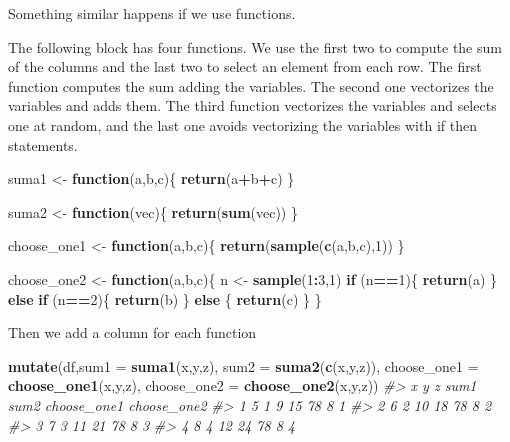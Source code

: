 \documentclass[
]{book}
\newenvironment{Shaded}{\begin{snugshade}}{\end{snugshade}}
\newcommand{\AttributeTok}[1]{\textcolor[rgb]{0.13,0.29,0.53}{#1}}
\newcommand{\CommentTok}[1]{\textcolor[rgb]{0.56,0.35,0.01}{\textit{#1}}}
\newcommand{\ControlFlowTok}[1]{\textcolor[rgb]{0.13,0.29,0.53}{\textbf{#1}}}
\newcommand{\DecValTok}[1]{\textcolor[rgb]{0.00,0.00,0.81}{#1}}
\newcommand{\FunctionTok}[1]{\textcolor[rgb]{0.13,0.29,0.53}{\textbf{#1}}}
\newcommand{\NormalTok}[1]{#1}
\newcommand{\OtherTok}[1]{\textcolor[rgb]{0.56,0.35,0.01}{#1}}
\newcommand{\SpecialCharTok}[1]{\textcolor[rgb]{0.81,0.36,0.00}{\textbf{#1}}}
\theoremstyle{definition}
\theoremstyle{definition}
\theoremstyle{definition}
\theoremstyle{definition}
\theoremstyle{remark}
\begin{document}
Something similar happens if we use functions.

The following block has four functions. We use the first two to compute the sum of the columns and the last two to select an element from each row. The first function computes the sum adding the variables. The second one vectorizes the variables and adds them. The third function vectorizes the variables and selects one at random, and the last one avoids vectorizing the variables with if then statements.

\begin{Shaded}
\begin{Highlighting}[]
\NormalTok{suma1 }\OtherTok{\textless{}{-}} \ControlFlowTok{function}\NormalTok{(a,b,c)\{}
  \FunctionTok{return}\NormalTok{(a}\SpecialCharTok{+}\NormalTok{b}\SpecialCharTok{+}\NormalTok{c)}
\NormalTok{\}}

\NormalTok{suma2 }\OtherTok{\textless{}{-}} \ControlFlowTok{function}\NormalTok{(vec)\{}
  \FunctionTok{return}\NormalTok{(}\FunctionTok{sum}\NormalTok{(vec))}
\NormalTok{\}}

\NormalTok{choose\_one1 }\OtherTok{\textless{}{-}} \ControlFlowTok{function}\NormalTok{(a,b,c)\{}
  \FunctionTok{return}\NormalTok{(}\FunctionTok{sample}\NormalTok{(}\FunctionTok{c}\NormalTok{(a,b,c),}\DecValTok{1}\NormalTok{))}
\NormalTok{\}}

\NormalTok{choose\_one2 }\OtherTok{\textless{}{-}} \ControlFlowTok{function}\NormalTok{(a,b,c)\{}
\NormalTok{  n }\OtherTok{\textless{}{-}} \FunctionTok{sample}\NormalTok{(}\DecValTok{1}\SpecialCharTok{:}\DecValTok{3}\NormalTok{,}\DecValTok{1}\NormalTok{)}
  \ControlFlowTok{if}\NormalTok{ (n}\SpecialCharTok{==}\DecValTok{1}\NormalTok{)\{}
    \FunctionTok{return}\NormalTok{(a)}
\NormalTok{  \} }\ControlFlowTok{else} \ControlFlowTok{if}\NormalTok{ (n}\SpecialCharTok{==}\DecValTok{2}\NormalTok{)\{}
    \FunctionTok{return}\NormalTok{(b)}
\NormalTok{  \} }\ControlFlowTok{else}\NormalTok{ \{}
    \FunctionTok{return}\NormalTok{(c)}
\NormalTok{  \}}
\NormalTok{\}}
\end{Highlighting}
\end{Shaded}

Then we add a column for each function

\begin{Shaded}
\begin{Highlighting}[]
\FunctionTok{mutate}\NormalTok{(df,}\AttributeTok{sum1 =} \FunctionTok{suma1}\NormalTok{(x,y,z), }\AttributeTok{sum2 =} \FunctionTok{suma2}\NormalTok{(}\FunctionTok{c}\NormalTok{(x,y,z)), }\AttributeTok{choose\_one1 =} \FunctionTok{choose\_one1}\NormalTok{(x,y,z), }\AttributeTok{choose\_one2 =} \FunctionTok{choose\_one2}\NormalTok{(x,y,z))}
\CommentTok{\#\textgreater{}   x y  z sum1 sum2 choose\_one1 choose\_one2}
\CommentTok{\#\textgreater{} 1 5 1  9   15   78           8           1}
\CommentTok{\#\textgreater{} 2 6 2 10   18   78           8           2}
\CommentTok{\#\textgreater{} 3 7 3 11   21   78           8           3}
\CommentTok{\#\textgreater{} 4 8 4 12   24   78           8           4}
\end{Highlighting}
\end{Shaded}
\end{document}
